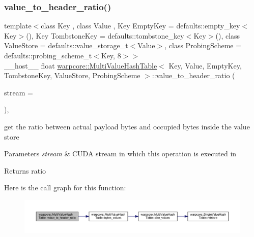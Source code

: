 \subsubsection{\texorpdfstring{value\+\_\+to\+\_\+header\+\_\+ratio()}{value\_to\_header\_ratio()}}
{\footnotesize\ttfamily template$<$class Key , class Value , Key Empty\+Key = defaults\+::empty\+\_\+key$<$\+Key$>$(), Key Tombstone\+Key = defaults\+::tombstone\+\_\+key$<$\+Key$>$(), class Value\+Store  = defaults\+::value\+\_\+storage\+\_\+t$<$\+Value$>$, class Probing\+Scheme  = defaults\+::probing\+\_\+scheme\+\_\+t$<$\+Key, 8$>$$>$ \\
\+\_\+\+\_\+host\+\_\+\+\_\+ float \hyperlink{classwarpcore_1_1MultiValueHashTable}{warpcore\+::\+Multi\+Value\+Hash\+Table}$<$ Key, Value, Empty\+Key, Tombstone\+Key, Value\+Store, Probing\+Scheme $>$\+::value\+\_\+to\+\_\+header\+\_\+ratio (\begin{DoxyParamCaption}\item[{cuda\+Stream\+\_\+t}]{stream = {} }\end{DoxyParamCaption})\hspace{0.3cm}{\ttfamily [inline]}, {\ttfamily [noexcept]}}



get the ratio between actual payload bytes and occupied bytes inside the value store 


\begin{DoxyParams}{Parameters}
{\em stream} & C\+U\+DA stream in which this operation is executed in \\
\hline
\end{DoxyParams}
\begin{DoxyReturn}{Returns}
ratio 
\end{DoxyReturn}
Here is the call graph for this function\+:
\nopagebreak
\begin{figure}[H]
\begin{center}
\leavevmode
\includegraphics[width=350pt]{classwarpcore_1_1MultiValueHashTable_a431ef6fae4419af72cf565430abbf7b6_cgraph}
\end{center}
\end{figure}
